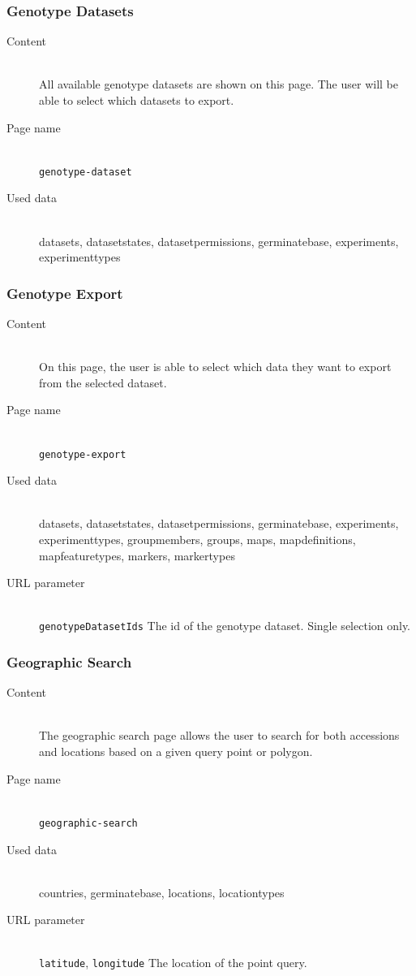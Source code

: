 \subsubsection{Genotype Datasets}
\begin{description}
	\item[Content]\hfill\\All available genotype datasets are shown on this page. The user will be able to select which datasets to export.
	\item[Page name]\hfill\\\texttt{genotype-dataset}
	\item[Used data]\hfill\\datasets, datasetstates, datasetpermissions, germinatebase, experiments, experimenttypes
\end{description}

\subsubsection{Genotype Export}
\begin{description}
	\item[Content]\hfill\\On this page, the user is able to select which data they want to export from the selected dataset.
	\item[Page name]\hfill\\\texttt{genotype-export}
	\item[Used data]\hfill\\datasets, datasetstates, datasetpermissions, germinatebase, experiments, experimenttypes, groupmembers, groups, maps, mapdefinitions, mapfeaturetypes, markers, markertypes
	\item[URL parameter]\hfill\\\texttt{genotypeDatasetIds} The id of the genotype dataset. Single selection only.
\end{description}

\subsubsection{Geographic Search}
\begin{description}
	\item[Content]\hfill\\The geographic search page allows the user to search for both accessions and locations based on a given query point or polygon.
	\item[Page name]\hfill\\\texttt{geographic-search}
	\item[Used data]\hfill\\countries, germinatebase, locations, locationtypes
	\item[URL parameter]\hfill\\\texttt{latitude}, \texttt{longitude} The location of the point query.
\end{description}

